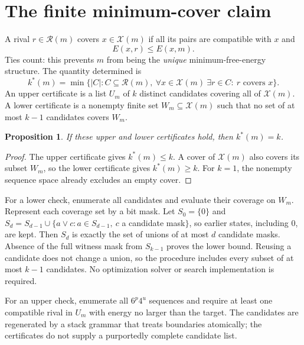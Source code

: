 \documentclass[10pt,a4paper]{article}
\newtheorem{proposition}{Proposition}
\newcommand{\Rset}{\mathcal R}
\newcommand{\Xset}{\mathcal X}
\begin{document}
\section{The finite minimum-cover claim}
A rival $r\in\Rset(m)$ covers $x\in\Xset(m)$ if all its pairs are compatible with $x$ and
\[
 E(x,r)\le E(x,m).
\]
Ties count: this prevents $m$ from being the \emph{unique} minimum-free-energy structure. The quantity determined is
\[
 k^*(m)=\min\bigl\{|C|:C\subseteq\Rset(m),\ \forall x\in\Xset(m)\ \exists r\in C:\ r\text{ covers }x\bigr\}.
\]
An upper certificate is a list $U_m$ of $k$ distinct candidates covering all of $\Xset(m)$. A lower certificate is a nonempty finite set $W_m\subseteq\Xset(m)$ such that no set of at most $k-1$ candidates covers $W_m$.

\begin{proposition}
If these upper and lower certificates hold, then $k^*(m)=k$.
\end{proposition}
\begin{proof}
The upper certificate gives $k^*(m)\le k$. A cover of $\Xset(m)$ also covers its subset $W_m$, so the lower certificate gives $k^*(m)\ge k$. For $k=1$, the nonempty sequence space already excludes an empty cover.
\end{proof}

For a lower check, enumerate all candidates and evaluate their coverage on $W_m$. Represent each coverage set by a bit mask. Let $S_0=\{0\}$ and $S_d=S_{d-1}\cup\{a\vee c: a\in S_{d-1},\ c$ a candidate mask$\}$, so earlier states, including $0$, are kept. Then $S_d$ is exactly the set of unions of at most $d$ candidate masks. Absence of the full witness mask from $S_{k-1}$ proves the lower bound. Reusing a candidate does not change a union, so the procedure includes every subset of at most $k-1$ candidates. No optimization solver or search implementation is required.

For an upper check, enumerate all $6^p4^u$ sequences and require at least one compatible rival in $U_m$ with energy no larger than the target. The candidates are regenerated by a stack grammar that treats boundaries atomically; the certificates do not supply a purportedly complete candidate list.
\end{document}
